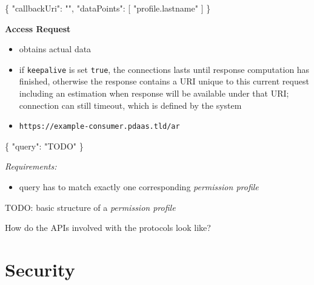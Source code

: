 \documentclass[12pt,english,a4paper,titlepage,cleardoublepage=empty,dottedtoc]{report}
\newenvironment{Shaded}{\begin{snugshade}}{\end{snugshade}}
\newcommand{\DataTypeTok}[1]{\textcolor[rgb]{0.13,0.29,0.53}{{#1}}}
\newcommand{\StringTok}[1]{\textcolor[rgb]{0.31,0.60,0.02}{{#1}}}
\newcommand{\OtherTok}[1]{\textcolor[rgb]{0.56,0.35,0.01}{{#1}}}
\newcommand{\FunctionTok}[1]{\textcolor[rgb]{0.00,0.00,0.00}{{#1}}}
\providecommand{\tightlist}{%
  \setlength{\itemsep}{0pt}\setlength{\parskip}{0pt}}
\begin{document}
\begin{Shaded}
\begin{Highlighting}[]
\FunctionTok{\{}
    \DataTypeTok{"callbackUri"}\FunctionTok{:} \StringTok{""}\FunctionTok{,}
    \DataTypeTok{"dataPoints"}\FunctionTok{:} \OtherTok{[}
        \StringTok{"profile.lastname"}
    \OtherTok{]}
\FunctionTok{\}}
\end{Highlighting}
\end{Shaded}

\textbf{Access Request}

\begin{itemize}
\tightlist
\item
  obtains actual data
\item
  if \texttt{keepalive} is set \texttt{true}, the connections lasts
  until response computation has finished, otherwise the response
  contains a URI unique to this current request including an estimation
  when response will be available under that URI; connection can still
  timeout, which is defined by the system
\item
  \texttt{https://example-consumer.pdaas.tld/ar}
\end{itemize}

\begin{Shaded}
\begin{Highlighting}[]
\FunctionTok{\{}
    \DataTypeTok{"query"}\FunctionTok{:} \StringTok{"TODO"}
\FunctionTok{\}}
\end{Highlighting}
\end{Shaded}

\emph{Requirements:}

\begin{itemize}
\tightlist
\item
  query has to match exactly one corresponding \emph{permission profile}
\end{itemize}

TODO: basic structure of a \emph{permission profile}

How do the APIs involved with the protocols look like?

\section{Security}\label{security}
\end{document}
